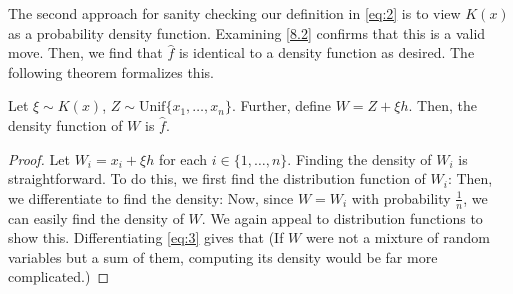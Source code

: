 The second approach for sanity checking our definition in \eqref{eq:2} is to view $K(x)$ as a probability density function. Examining \eqref{8.2} confirms that this is a valid move. Then, we find that $\hat{f}$ is identical to a density function as desired. The following theorem formalizes this.  

\begin{theorem}
Let $\xi \sim K(x)$, $Z \sim \mathrm{Unif}\{x_1, \dots, x_n\}$. Further, define $W = Z + \xi h$. Then, the density function of $W$ is $\hat{f}$.
\end{theorem}
\begin{proof}
Let $W_i = x_i + \xi h $ for each $i \in \{1, \dots, n\}$. Finding the density of $W_i$ is straightforward. To do this, we first find the distribution function of $W_i$:
Then, we differentiate to find the density:
Now, since $W = W_i$ with probability $\frac{1}{n}$, we can easily find the density of $W$. We again appeal to distribution functions to show this.
Differentiating \eqref{eq:3} gives that 
(If $W$ were not a mixture of random variables but a sum of them, computing its density would be far more complicated.)
\end{proof}



